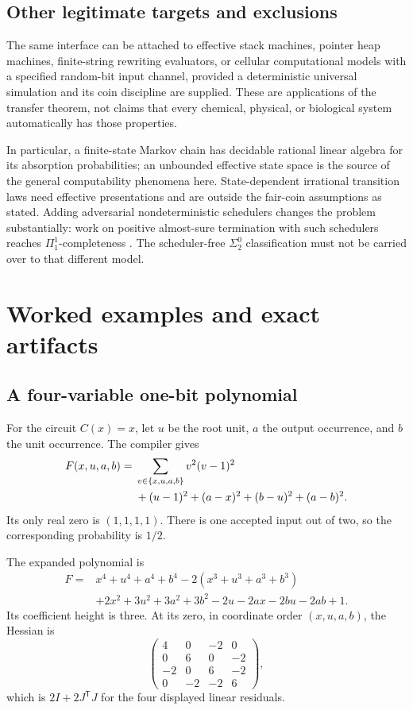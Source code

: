 \documentclass[11pt,letterpaper]{article}
\numberwithin{equation}{section}
\theoremstyle{definition}
\theoremstyle{remark}
\newcommand{\sigtwo}{\Sigma^0_2}
\newcommand{\srcmark}[1]{\par\noindent{\small\itshape [source~#1]}\par}
\begin{document}
\subsection{Other legitimate targets and exclusions}
The same interface can be attached to effective stack machines, pointer
heap machines, finite-string rewriting evaluators, or cellular
computational models with a specified random-bit input channel, provided
a deterministic universal simulation and its coin discipline are supplied.
These are applications of the transfer theorem, not claims that every
chemical, physical, or biological system automatically has those
properties.

In particular, a finite-state Markov chain has decidable rational linear
algebra for its absorption probabilities; an unbounded effective state
space is the source of the general computability phenomena here.
State-dependent irrational transition laws need effective presentations
and are outside the fair-coin assumptions as stated. Adding adversarial
nondeterministic schedulers changes the problem substantially: work on
positive almost-sure termination with such schedulers reaches
$\Pi^1_1$-completeness \cite{b62s13-majumdar2023}. The scheduler-free
$\sigtwo$ classification must not be carried over to that different model.

\section{Worked examples and exact artifacts}\label{pqc:ql:sec:examples}
\srcmark{13}

\subsection{A four-variable one-bit polynomial}
For the circuit $C(x)=x$, let $u$ be the root unit, $a$ the output occurrence,
and $b$ the unit occurrence. The compiler gives
\begin{align}\label{pqc:ql:eq:onebit}
 F(x,u,a,b)={}&\sum_{v\in\{x,u,a,b\}}v^2(v-1)^2\\
 &+(u-1)^2+(a-x)^2+(b-u)^2+(a-b)^2.\notag
\end{align}
Its only real zero is $(1,1,1,1)$. There is one accepted input out of two,
so the corresponding probability is $1/2$.

The expanded polynomial is
\begin{align*}
 F={}&x^4+u^4+a^4+b^4-2(x^3+u^3+a^3+b^3)\\
 &+2x^2+3u^2+3a^2+3b^2-2u-2ax-2bu-2ab+1.
\end{align*}
Its coefficient height is three. At its zero, in coordinate order
$(x,u,a,b)$, the Hessian is
\[
 \begin{pmatrix}
 4&0&-2&0\\
 0&6&0&-2\\
 -2&0&6&-2\\
 0&-2&-2&6
 \end{pmatrix},
\]
which is $2I+2J^{\mathsf T}J$ for the four displayed linear residuals.
\end{document}
